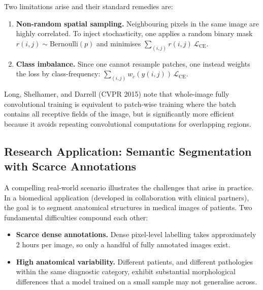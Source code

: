 \documentclass[11pt,a4paper]{article}
\begin{document}
Two limitations arise and their standard remedies are:
\begin{enumerate}
  \item \textbf{Non-random spatial sampling.} Neighbouring pixels in the same image are highly correlated. To inject stochasticity, one applies a random binary mask $r(i,j) \sim \text{Bernoulli}(p)$ and minimises $\sum_{(i,j)} r(i,j)\,\mathcal{L}_{\text{CE}}$.
  \item \textbf{Class imbalance.} Since one cannot resample patches, one instead weights the loss by class-frequency: $\sum_{(i,j)} w_c(y(i,j))\,\mathcal{L}_{\text{CE}}$.
\end{enumerate}

\begin{notebox}
Long, Shelhamer, and Darrell (CVPR 2015) note that whole-image fully convolutional training is equivalent to patch-wise training where the batch contains all receptive fields of the image, but is significantly more efficient because it avoids repeating convolutional computations for overlapping regions.
\end{notebox}

\subsection{Research Application: Semantic Segmentation with Scarce Annotations}
\label{sec:semseg_research}

A compelling real-world scenario illustrates the challenges that arise in practice. In a biomedical application (developed in collaboration with clinical partners), the goal is to segment anatomical structures in medical images of patients. Two fundamental difficulties compound each other:

\begin{itemize}
  \item \textbf{Scarce dense annotations.} Dense pixel-level labelling takes approximately 2 hours per image, so only a handful of fully annotated images exist.
  \item \textbf{High anatomical variability.} Different patients, and different pathologies within the same diagnostic category, exhibit substantial morphological differences that a model trained on a small sample may not generalise across.
\end{itemize}
\end{document}
